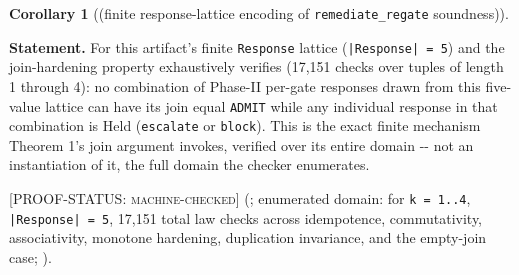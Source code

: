 \documentclass[11pt,a4paper]{article}
\theoremstyle{definition}
\newtheorem{corollary}{Corollary}
\newcommand{\proofstatus}[1]{[\textsc{PROOF-STATUS}: \textsc{#1}]}
\begin{document}
\setcounter{corollary}{2}
\begin{corollary}[(finite response-lattice encoding of \texttt{remediate\_regate} soundness)]
\label{cor:3}

\noindent\textbf{Statement.} For this artifact's finite \texttt{Response} lattice (\texttt{|Response| = 5}) and the join-hardening property  exhaustively verifies (17,151 checks over tuples of length 1 through 4): no combination of Phase-II per-gate responses drawn from this five-value lattice can have its join equal \texttt{ADMIT} while any individual response in that combination is Held (\texttt{escalate} or \texttt{block}). This is the exact finite mechanism Theorem 1's join argument invokes, verified over its entire domain -{}- not an instantiation of it, the full domain the checker enumerates.

\proofstatus{machine-checked} (; enumerated domain:  for \texttt{k = 1..4}, \texttt{|Response| = 5}, 17,151 total law checks across idempotence, commutativity, associativity, monotone hardening, duplication invariance, and the empty-join case; ).
\end{corollary}
\end{document}
